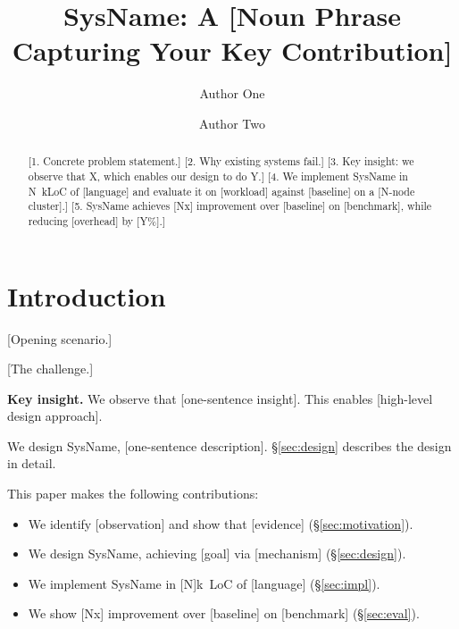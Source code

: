 \documentclass[sigplan,10pt]{acmart}
\newcommand{\sysname}{SysName\xspace}   %
\begin{document}
\title{\sysname: A [Noun Phrase Capturing Your Key Contribution]}

\author{Author One}
\author{Author Two}

\begin{abstract}

[1. Concrete problem statement.] [2. Why existing systems fail.] [3. Key insight:
we observe that X, which enables our design to do Y.] [4. We implement \sysname
in N~kLoC of [language] and evaluate it on [workload] against [baseline] on a
[N-node cluster].] [5. \sysname achieves [Nx] improvement over [baseline] on
[benchmark], while reducing [overhead] by [Y\%].]
\end{abstract}

\maketitle
\pagestyle{plain}   %

\section{Introduction}

[Opening scenario.]

[The challenge.]

\textbf{Key insight.}
We observe that [one-sentence insight]. This enables [high-level design approach].

We design \sysname, [one-sentence description]. \S\ref{sec:design} describes the
design in detail.

This paper makes the following contributions:
\begin{itemize}
  \item We identify [observation] and show that [evidence] (\S\ref{sec:motivation}).
  \item We design \sysname, achieving [goal] via [mechanism] (\S\ref{sec:design}).
  \item We implement \sysname in [N]k~LoC of [language] (\S\ref{sec:impl}).
  \item We show [Nx] improvement over [baseline] on [benchmark] (\S\ref{sec:eval}).
\end{itemize}
\end{document}
